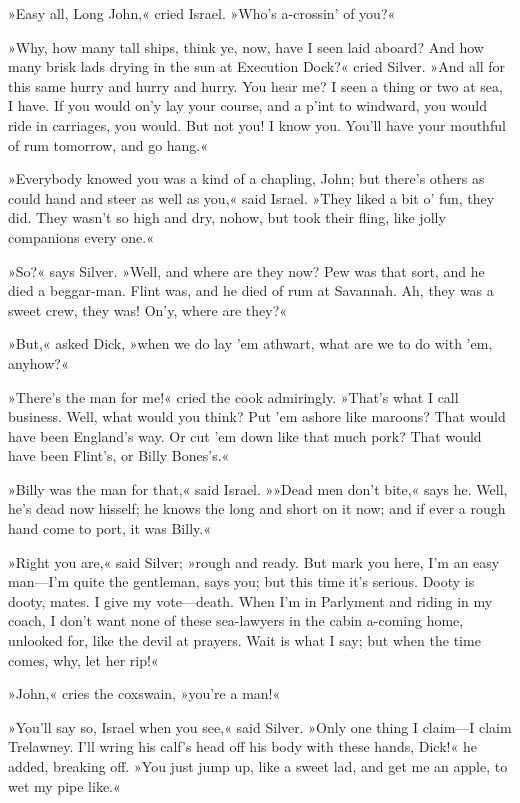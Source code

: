 »Easy all, Long John,« cried Israel. »Who's a-crossin' of you?«

»Why, how many tall ships, think ye, now, have I seen laid aboard? And how many brisk lads drying in the sun at Execution Dock?« cried Silver. »And all for this same hurry and hurry and hurry. You hear me? I seen a thing or two at sea, I have. If you would on'y lay your course, and a p'int to windward, you would ride in carriages, you would. But not you! I know you. You'll have your mouthful of rum tomorrow, and go hang.«

»Everybody knowed you was a kind of a chapling, John; but there's others as could hand and steer as well as you,« said Israel. »They liked a bit o' fun, they did. They wasn't so high and dry, nohow, but took their fling, like jolly companions every one.«

»So?« says Silver. »Well, and where are they now? Pew was that sort, and he died a beggar-man. Flint was, and he died of rum at Savannah. Ah, they was a sweet crew, they was! On'y, where are they?«

»But,« asked Dick, »when we do lay 'em athwart, what are we to do with 'em, anyhow?«

»There's the man for me!« cried the cook admiringly. »That's what I call business. Well, what would you think? Put 'em ashore like maroons? That would have been England's way. Or cut 'em down like that much pork? That would have been Flint's, or Billy Bones's.«

»Billy was the man for that,« said Israel. »»Dead men don't bite,« says he. Well, he's dead now hisself; he knows the long and short on it now; and if ever a rough hand come to port, it was Billy.«

»Right you are,« said Silver; »rough and ready. But mark you here, I'm an easy man—I'm quite the gentleman, says you; but this time it's serious. Dooty is dooty, mates. I give my vote—death. When I'm in Parlyment and riding in my coach, I don't want none of these sea-lawyers in the cabin a-coming home, unlooked for, like the devil at prayers. Wait is what I say; but when the time comes, why, let her rip!«

»John,« cries the coxswain, »you're a man!«

»You'll say so, Israel when you see,« said Silver. »Only one thing I claim—I claim Trelawney. I'll wring his calf's head off his body with these hands, Dick!« he added, breaking off. »You just jump up, like a sweet lad, and get me an apple, to wet my pipe like.«

